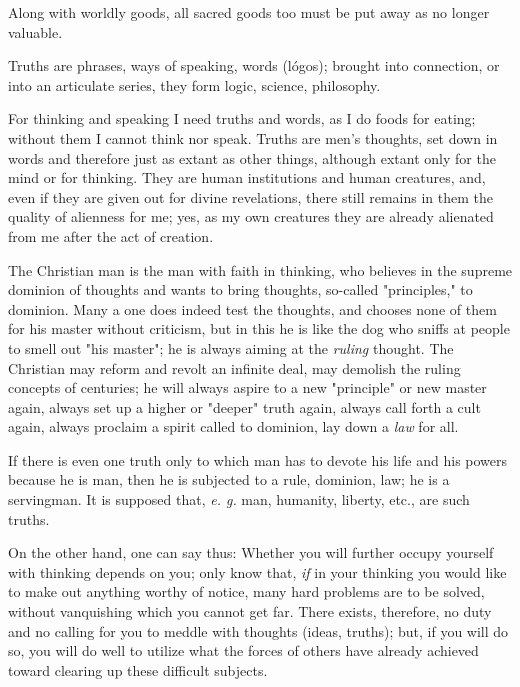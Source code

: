 \documentclass[a4paper]{book}
\begin{document}
Along with worldly goods, all sacred goods too must be put away as no longer 
valuable.

Truths are phrases, ways of speaking, words (l\'ogos); brought into 
connection, or into an articulate series, they form logic, science, 
philosophy.

For thinking and speaking I need truths and words, as I do foods for eating; 
without them I cannot think nor speak. Truths are men's thoughts, set down in 
words and therefore just as extant as other things, although extant only for 
the mind or for thinking. They are human institutions and human creatures, 
and, even if they are given out for divine revelations, there still remains in 
them the quality of alienness for me; yes, as my own creatures they are 
already alienated from me after the act of creation.

The Christian man is the man with faith in thinking, who believes in the 
supreme dominion of thoughts and wants to bring thoughts, so-called 
"{}principles,"{} to dominion. Many a one does indeed test the thoughts, and 
chooses none of them for his master without criticism, but in this he is like 
the dog who sniffs at people to smell out "{}his master"{}; he is always 
aiming at the \textit{ruling} thought. The Christian may reform and revolt an 
infinite deal, may demolish the ruling concepts of centuries; he will always 
aspire to a new "{}principle"{} or new master again, always set up a higher or 
"{}deeper"{} truth again, always call forth a cult again, always proclaim a 
spirit called to dominion, lay down a \textit{law} for all.

If there is even one truth only to which man has to devote his life and his 
powers because he is man, then he is subjected to a rule, dominion, law; he is 
a servingman. It is supposed that, \textit{e. g.} man, humanity, liberty, 
etc., are such truths.

On the other hand, one can say thus: Whether you will further occupy yourself 
with thinking depends on you; only know that, \textit{if} in your thinking you 
would like to make out anything worthy of notice, many hard problems are to be 
solved, without vanquishing which you cannot get far. There exists, therefore, 
no duty and no calling for you to meddle with thoughts (ideas, truths); but, 
if you will do so, you will do well to utilize what the forces of others have 
already achieved toward clearing up these difficult subjects.
\end{document}
